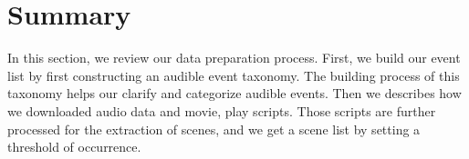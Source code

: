 \section{Summary}
In this section, we review our data preparation process. 
First, we build our event list by first constructing an audible event taxonomy. 
The building process of this taxonomy helps our clarify and categorize audible events. 
Then we describes how we downloaded audio data and movie, play scripts. 
Those scripts are further processed for the extraction of scenes, and we get a scene list by setting a threshold of occurrence. 
